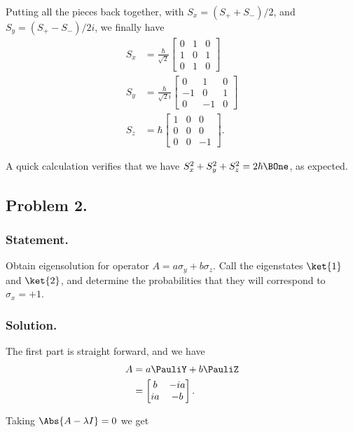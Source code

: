 Putting all the pieces back together, with $S_x = (S_{+} + S_{-})/2$, and $S_y = (S_{+} - S_{-})/2i$, we finally have
\begin{align}\label{eqn:desaiCh5:111}
S_x &=
\frac{\hbar}{\sqrt{2}}
\begin{bmatrix}
0 & 1 & 0 \\
1 & 0 & 1 \\
0 & 1 & 0
\end{bmatrix} \\
S_y &=
\frac{\hbar}{\sqrt{2} i}
\begin{bmatrix}
0 & 1 & 0 \\
-1 & 0 & 1 \\
0 & -1 & 0
\end{bmatrix} \\
S_z &=
\hbar
\begin{bmatrix}
1 & 0 & 0 \\
0 & 0 & 0 \\
0 & 0 & -1
\end{bmatrix}.
\end{align}

A quick calculation verifies that we have $S_x^2 + S_y^2 + S_z^2 = 2 \hbar \BOne$, as expected.

\subsection{Problem 2.}
\subsubsection{Statement.}

Obtain eigensolution for operator $A = a \sigma_y + b \sigma_z$.  Call the eigenstates $\ket{1}$ and $\ket{2}$, and determine the probabilities that they will correspond to $\sigma_x = +1$.

\subsubsection{Solution.}

The first part is straight forward, and we have
\begin{align*}
A &= a \PauliY + b \PauliZ \\
&=
\begin{bmatrix}
b & -i a \\
ia & -b
\end{bmatrix}.
\end{align*}

Taking $\Abs{A - \lambda I} = 0$ we get

